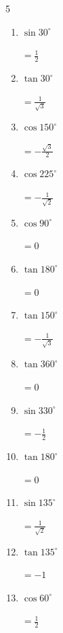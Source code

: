 \begin{multicols}{5}
\begin{enumerate}
  \item $\displaystyle \sin{30^\circ}$

        $\displaystyle =\frac{1}{2}$

  \item $\displaystyle \tan{30^\circ}$

        $\displaystyle =\frac{1}{\sqrt{3}}$

  \item $\displaystyle \cos{150^\circ}$

        $\displaystyle =-\frac{\sqrt{3}}{2}$

  \item $\displaystyle \cos{225^\circ}$

        $\displaystyle =-\frac{1}{\sqrt{2}}$

  \item $\displaystyle \cos{90^\circ}$

        $\displaystyle =0$

  \item $\displaystyle \tan{180^\circ}$

        $\displaystyle =0$

  \item $\displaystyle \tan{150^\circ}$

        $\displaystyle =-\frac{1}{\sqrt{3}}$

\columnbreak %

  \item $\displaystyle \tan{360^\circ}$

        $\displaystyle =0$

  \item $\displaystyle \sin{330^\circ}$

        $\displaystyle =-\frac{1}{2}$

  \item $\displaystyle \tan{180^\circ}$

        $\displaystyle =0$

  \item $\displaystyle \sin{135^\circ}$

        $\displaystyle =\frac{1}{\sqrt{2}}$

  \item $\displaystyle \tan{135^\circ}$

        $\displaystyle =-1$

  \item $\displaystyle \cos{60^\circ}$

        $\displaystyle =\frac{1}{2}$


\end{enumerate}
\end{multicols}
